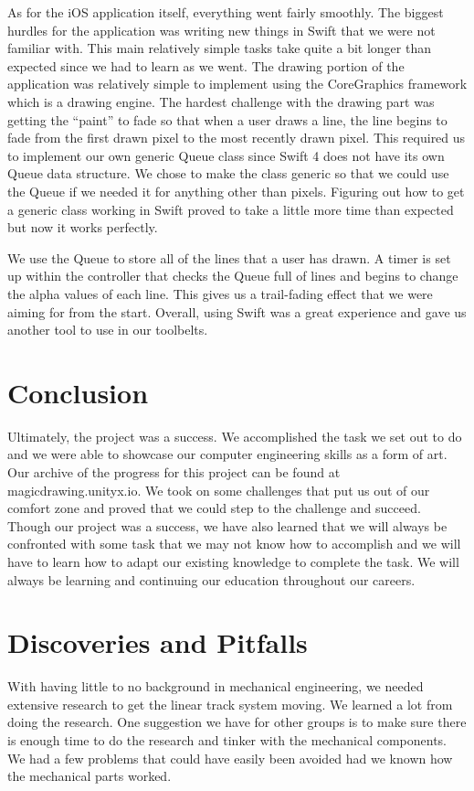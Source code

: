 \documentclass[11pt]{IEEEtran}
\begin{document}
As for the iOS application itself, everything went fairly smoothly. The biggest hurdles for the application was writing new things in Swift that we were not familiar with. This main relatively simple tasks take quite a bit longer than expected since we had to learn as we went. The drawing portion of the application was relatively simple to implement using the CoreGraphics framework which is a drawing engine. The hardest challenge with the drawing part was getting the “paint” to fade so that when a user draws a line, the line begins to fade from the first drawn pixel to the most recently drawn pixel. This required us to implement our own generic Queue class since Swift 4 does not have its own Queue data structure. We chose to make the class generic so that we could use the Queue if we needed it for anything other than pixels. Figuring out how to get a generic class working in Swift proved to take a little more time than expected but now it works perfectly.

We use the Queue to store all of the lines that a user has drawn. A timer is set up within the controller that checks the Queue full of lines and begins to change the alpha values of each line. This gives us a trail-fading effect that we were aiming for from the start. Overall, using Swift was a great experience and gave us another tool to use in our toolbelts.

\section{Conclusion}
Ultimately, the project was a success. We accomplished the task we set out to do and we were able to showcase our computer engineering skills as a form of art. Our archive of the progress for this project can be found at magicdrawing.unityx.io. We took on some challenges that put us out of our comfort zone and proved that we could step to the challenge and succeed. Though our project was a success, we have also learned that we will always be confronted with some task that we may not know how to accomplish and we will have to learn how to adapt our existing knowledge to complete the task. We will always be learning and continuing our education throughout our careers.

\newpage

\appendices

\section{Discoveries and Pitfalls}
With having little to no background in mechanical engineering, we needed extensive research to get the linear track system moving. We learned a lot from doing the research. One suggestion we have for other groups is to make sure there is enough time to do the research and tinker with the mechanical components. We had a few problems that could have easily been avoided had we known how the mechanical parts worked.
\end{document}
